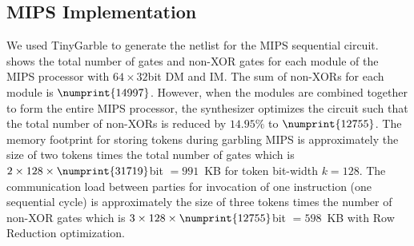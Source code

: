\subsection{MIPS Implementation}
We used TinyGarble to generate the netlist for the MIPS sequential circuit.
 shows the total number of gates and non-XOR gates for each module of the MIPS processor with $64\times32$bit DM and IM.
The sum of non-XORs for each module is $\numprint{14997}$.
However, when the modules are combined together to form the entire MIPS processor, the synthesizer optimizes the circuit such that the total number of non-XORs is reduced by $14.95\%$ to $\numprint{12755}$.
The memory footprint for storing tokens during garbling MIPS is approximately the size of two tokens times the total number of gates which is $2 \times 128 \times \numprint{31719}$bit $=991$~KB for token bit-width $k=128$.
The communication load between parties for invocation of one instruction (one sequential cycle) is approximately the size of three tokens times the number of non-XOR gates which is $3\times 128 \times \numprint{12755}$bit $=598$~KB with Row Reduction optimization.

